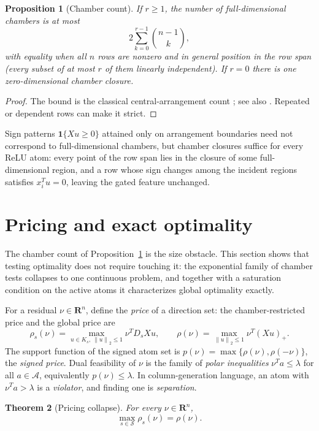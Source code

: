 \documentclass[12pt]{article}
\theoremstyle{plain}
\newtheorem{theorem}{Theorem}
\newtheorem{proposition}[theorem]{Proposition}
\theoremstyle{definition}
\newcommand{\reals}{\mathbf{R}}
\newcommand{\A}{\mathcal{A}}
\newcommand{\norm}[1]{\left\lVert #1\right\rVert}
\newcommand{\relu}[1]{\left(#1\right)_+}
\newcommand{\ones}{\mathbf{1}}
\begin{document}
\begin{proposition}[Chamber count]\label{p-chamber-count}
If $r\ge1$, the number of full-dimensional chambers is at most
\[
  2\sum_{k=0}^{r-1}\binom{n-1}{k},
\]
with equality when all $n$ rows are nonzero and in general position in the
row span (every subset of at most $r$ of them linearly independent). If $r=0$ there is
one zero-dimensional chamber closure.
\end{proposition}

\begin{proof}
The bound is the classical central-arrangement count
\citep[Theorem~2]{cover1965geometrical}; see also
\citet[Chapter~2]{stanley2007arrangements}. Repeated or dependent rows can
make it strict.
\end{proof}

Sign patterns $\ones\{Xu\ge0\}$ attained only on arrangement boundaries need
not correspond to full-dimensional chambers, but chamber closures suffice for
every ReLU atom: every point of the row span lies in the closure of some
full-dimensional region, and a row whose sign changes among the incident
regions satisfies $x_i^Tu=0$, leaving the gated feature unchanged.

\section{Pricing and exact optimality}\label{s-optimality}

The chamber count of Proposition~\ref{p-chamber-count} is the size obstacle.
This section shows that testing optimality does not require touching it: the
exponential family of chamber tests collapses to one continuous problem, and
together with a saturation condition on the active atoms it characterizes
global optimality exactly.

For a residual $\nu\in\reals^n$, define the \emph{price} of a direction set:
the chamber-restricted price and the global price are
\[
  \rho_s(\nu)=\max_{u\in K_s,\ \norm u_2\le1}\nu^TD_sXu,
  \qquad
  \rho(\nu)=\max_{\norm u_2\le1}\nu^T\relu{Xu}.
\]
The support function of the signed atom set is
$p(\nu)=\max\{\rho(\nu),\rho(-\nu)\}$, the \emph{signed price}. Dual
feasibility of $\nu$ is the family of \emph{polar inequalities} $\nu^Ta\le
\lambda$ for all $a\in\A$, equivalently $p(\nu)\le\lambda$. In
column-generation language, an atom with $\nu^Ta>\lambda$ is a
\emph{violator}, and finding one is \emph{separation}.

\begin{theorem}[Pricing collapse]\label{t-collapse}
For every $\nu\in\reals^n$,
\[
  \max_{s\in\mathcal S}\rho_s(\nu)=\rho(\nu).
\]
\end{theorem}
\end{document}
